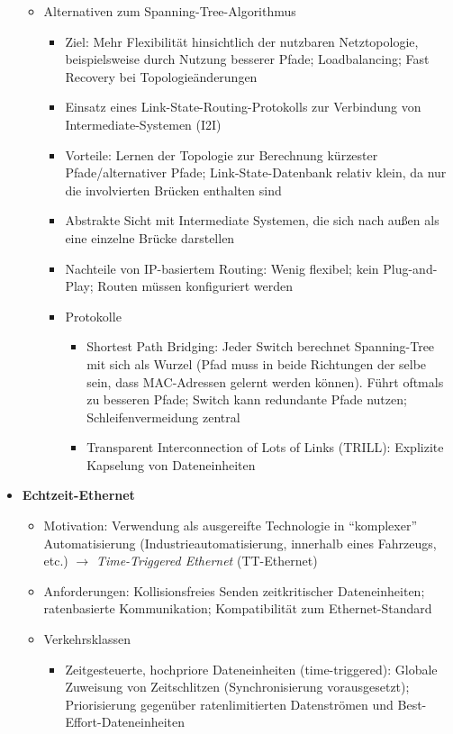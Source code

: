 \begin{itemize}
\begin{itemize}
\begin{itemize}
		\end{itemize}
		\item Alternativen zum Spanning-Tree-Algorithmus
		\begin{itemize}
			\item Ziel: Mehr Flexibilität hinsichtlich der nutzbaren Netztopologie, beispielsweise durch Nutzung besserer Pfade; Loadbalancing; Fast Recovery bei Topologieänderungen
			\item Einsatz eines Link-State-Routing-Protokolls zur Verbindung von Intermediate-Systemen (I2I)
			\item Vorteile: Lernen der Topologie zur Berechnung kürzester Pfade/alternativer Pfade; Link-State-Datenbank relativ klein, da nur die involvierten Brücken enthalten sind
			\item Abstrakte Sicht mit Intermediate Systemen, die sich nach außen als eine einzelne Brücke darstellen
			\item Nachteile von IP-basiertem Routing: Wenig flexibel; kein Plug-and-Play; Routen müssen konfiguriert werden
			\item Protokolle
			\begin{itemize}
				\item Shortest Path Bridging: Jeder Switch berechnet Spanning-Tree mit sich als Wurzel (Pfad muss in beide Richtungen der selbe sein, dass MAC-Adressen gelernt werden können). Führt oftmals zu besseren Pfade; Switch kann redundante Pfade nutzen; Schleifenvermeidung zentral
				\item Transparent Interconnection of Lots of Links (TRILL): Explizite Kapselung von Dateneinheiten
			\end{itemize}
		\end{itemize}
	\end{itemize}
	\item \textbf{Echtzeit-Ethernet}
	\begin{itemize}
		\item Motivation: Verwendung als ausgereifte Technologie in "`komplexer"' Automatisierung (Industrieautomatisierung, innerhalb eines Fahrzeugs, etc.) \(\rightarrow\) \textit{Time-Triggered Ethernet} (TT-Ethernet)
		\item Anforderungen: Kollisionsfreies Senden zeitkritischer Dateneinheiten; ratenbasierte Kommunikation; Kompatibilität zum Ethernet-Standard
		\item Verkehrsklassen
		\begin{itemize}
			\item Zeitgesteuerte, hochpriore Dateneinheiten (time-triggered): Globale Zuweisung von Zeitschlitzen (Synchronisierung vorausgesetzt); Priorisierung gegenüber ratenlimitierten Datenströmen und Best-Effort-Dateneinheiten

\end{itemize}
\end{itemize}
\end{itemize}
